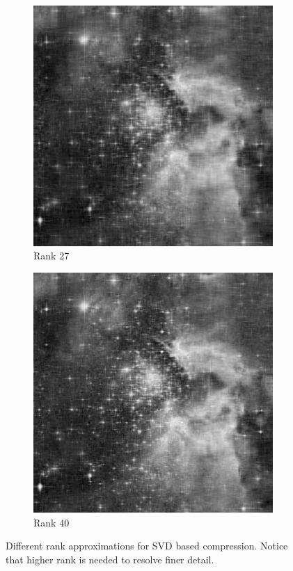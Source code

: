 \begin{figure}
\begin{subfigure}[b]{.25\textwidth}
\centering
\includegraphics[width=\textwidth]{rank27.jpg}
\caption{Rank 27}
\end{subfigure}
\begin{subfigure}[b]{.25\textwidth}
\centering
\includegraphics[width=\textwidth]{rank40.jpg}
\caption{Rank 40}
\end{subfigure}
\caption{Different rank approximations for SVD based compression.  Notice that higher rank is needed to resolve finer detail.}
\label{fig:rankvalues}
\end{figure}

